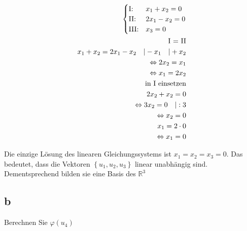 \begin{align*}
    \begin{cases}
        \text{I:\@}   & x_1 + x_2 = 0  \\
        \text{II:\@}  & 2x_1 - x_2 = 0 \\
        \text{III:\@} & x_3 = 0        \\
    \end{cases}                                                          \\
    \text{I = II}                                                                           \\
    x_1 + x_2 = 2x_1 - x_2 \quad | -x_1 \quad | +x_2                                        \\
    \Leftrightarrow  2x_2 = x_1                                                             \\
    \Leftrightarrow x_1 = 2x_2                                                              \\
    \text{in I einsetzen}                                                                   \\
    2x_2 + x_2 = 0                                                                          \\
    \Leftrightarrow 3x_2 = 0 \quad | : 3                                                    \\
    \Leftrightarrow x_2 = 0                                                                 \\
    x_1 = 2 \cdot 0                                                                         \\
    \Leftrightarrow x_1 = 0
\end{align*}

Die einzige Lösung des linearen Gleichungssystems ist $x_1 = x_2 = x_3 = 0$.
Das bedeutet, dass die Vektoren $\left\{u_1, u_2, u_3\right\}$ linear
unabhängig sind. Dementsprechend bilden sie eine Basis des $\mathbb{R}^3$

\subsection{b}
Berechnen Sie $\varphi(u_4)$

